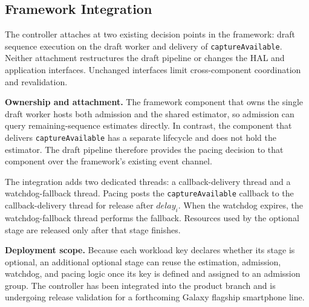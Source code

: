\subsection{Framework Integration}
\label{sec:implementation}

The controller attaches at two existing decision points in the framework: draft sequence execution on the draft worker and delivery of \texttt{captureAvailable}.
Neither attachment restructures the draft pipeline or changes the HAL and application interfaces.
Unchanged interfaces limit cross-component coordination and revalidation.

\smallskip\noindent\textbf{Ownership and attachment.}
The framework component that owns the single draft worker hosts both admission and the shared estimator, so admission can query remaining-sequence estimates directly.
In contrast, the component that delivers \texttt{captureAvailable} has a separate lifecycle and does not hold the estimator.
The draft pipeline therefore provides the pacing decision to that component over the framework's existing event channel.

The integration adds two dedicated threads: a callback-delivery thread and a watchdog-fallback thread.
Pacing posts the \texttt{captureAvailable} callback to the callback-delivery thread for release after \(\mathit{delay}_i\).
When the watchdog expires, the watchdog-fallback thread performs the fallback.
Resources used by the optional stage are released only after that stage finishes.

\smallskip\noindent\textbf{Deployment scope.}
Because each workload key declares whether its stage is optional, an additional optional stage can reuse the estimation, admission, watchdog, and pacing logic once its key is defined and assigned to an admission group.
The controller has been integrated into the product branch and is undergoing release validation for a forthcoming Galaxy flagship smartphone line.
